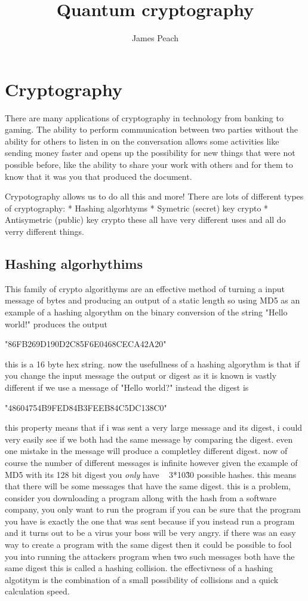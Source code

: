 \documentclass[12pt]{article}
\begin{document}
\author{James Peach}
\title{Quantum cryptography}


\maketitle

\section{Cryptography}
There are many applications of cryptography in technology from banking
to gaming. The ability to perform communication between two parties
without the ability for others to listen in on the conversation allows
some activities like sending money faster and opens up the possibility
for new things that were not possible before, like the ability to share
your work with others and for them to know that it was you that produced
the document.

Crypotography allows us to do all this and more! There are lots of
different types of cryptography:
  *  Hashing algorhtyms
  *  Symetric (secret) key crypto
  *  Antisymetric (public) key crypto
these all have very different uses and all do verry different things.

\subsection{Hashing algorhythims}
This family of crypto algorithyms are an effective method of turning
a input message of bytes and producing an output of a static length
so using MD5 as an example of a hashing algorythm on the binary conversion
of the string "Hello world!" produces the output 

"86FB269D190D2C85F6E0468CECA42A20"

this is a 16 byte hex string. now the usefullness of a hashing algorythm
is that if you change the input message the output or digest as it is known
is vastly different if we use a message of "Hello world?" instead the digest
is 

"48604754B9FED84B3FEEB84C5DC138C0" 

this property means that if i was sent
a very large message and its digest, i could very easily see if we both had
the same message by comparing the digest. even one mistake in the message
will produce a completley different digest.
now of course the number of different messages is infinite however given
the example of MD5 with its 128 bit digest you \textit{only} have ~ 3*10\^30
possible hashes. this means that there will be some messages that have the
same digest. this is a problem, consider you downloading a program allong
with the hash from a software company, you only want to run the program if
you can be sure that the program you have is exactly the one that was sent
because if you instead run a program and it turns out to be a virus your boss
will be very angry. if there was an easy way to create a program with the
same digest then it could be possible to fool you into running the attackers program
when two such messages both have the same digest this is called a hashing
collision. the effectivness of a hashing algotitym is the combination of
a small possibility of collisions and a quick calculation speed.
\end{document}

